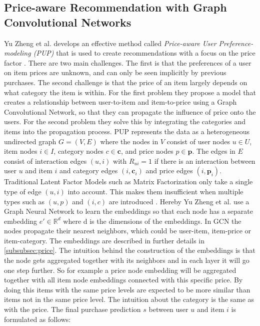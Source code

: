 \subsection{Price-aware Recommendation with Graph Convolutional Networks}\label{subsec:price-intro}
Yu Zheng et al. develops an effective method called \textit{Price-aware User Preference-modeling (PUP)} that is used to create recommendations with a focus on the price factor \cite{Priceaware}.
There are two main challenges.
The first is that the preferences of a user on item prices are unknown, and can only be seen implicitly by previous purchases.
The second challenge is that the price of an item largely depends on what category the item is within.
For the first problem they propose a model that creates a relationship between user-to-item and item-to-price using a Graph Convolutional Network, so that they can propagate the influence of price onto the users.
For the second problem they solve this by integrating the categories and items into the propagation process.
PUP represents the data as a heterogeneous undirected graph $G = (V,E)$ where the nodes in $V$ consist of user nodes $u \in U$, item nodes $i \in I$, category nodes $c \in \textbf{c}$, and price nodes $p \in \textbf{p}$.
The edges in $E$ consist of interaction edges $(u, i)$ with $R_{ui} = 1$ if there is an interaction between user $u$ and item $i$ and category edges $(i, \textbf{c}_i)$ and price edges $(i, \textbf{p}_i)$.
Traditional Latent Factor Models such as Matrix Factorization only take a single type of edge $(u, i)$ into account.
This makes them insufficient when multiple types such as $(u, p)$ and $(i, c)$ are introduced \cite{Priceaware}.
Hereby Yu Zheng et al. use a Graph Neural Network to learn the embeddings so that each node has a separate embedding $e' \in \mathbb{R}^d$ where d is the dimensions of the embeddings.
In GCN the nodes propagate their nearest neighbors, which could be user-item, item-price or item-category.
The embeddings are described in further details in \autoref{subsubsec:price}.
The intuition behind the construction of the embeddings is that the node gets aggregated together with its neighbors and in each layer it will go one step further.
So for example a price node embedding will be aggregated together with all item node embeddings connected with this specific price.
By doing this items with the same price levels are expected to be more similar than items not in the same price level.
The intuition about the category is the same as with the price.
The final purchase prediction $s$ between user $u$ and item $i$ is formulated as follows:
